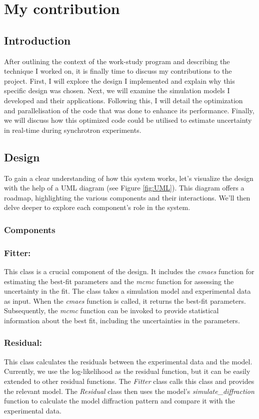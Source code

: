 \section{My contribution}

\subsection{Introduction}

After outlining the context of the work-study program and describing the technique I worked
on, it is finally time to discuss my contributions to the project. First, I will explore 
the design I implemented and explain why this specific design was chosen. Next, we will 
examine the simulation models I developed and their applications. Following this, I will 
detail the optimization and parallelisation of the code that was done to enhance its performance. 
Finally, we will discuss how this optimized code could be utilised to estimate uncertainty
in real-time during synchrotron experiments.

\subsection{Design}

To gain a clear understanding of how this system works, let's visualize the design with the help of a 
UML diagram (see Figure \ref{fig:UML}). This diagram offers a roadmap, highlighting the various components and their interactions.
 We'll then delve deeper to explore each component's role in the system.
\subsubsection{Components}

\subsubsection*{\textbf{Fitter:}}
This class is a crucial component of the design. It includes the \textit{cmaes} function for estimating the
best-fit parameters and the \textit{mcmc} function for assessing the uncertainty in the fit. The class takes
a simulation model and experimental data as input. When the \textit{cmaes} function is called, it returns the best-fit parameters.
Subsequently, the \textit{mcmc} function can be invoked to provide statistical information about the best
fit, including the uncertainties in the parameters.

\subsubsection*{\textbf{Residual:}}
This class calculates the residuals between the experimental data and the model.
Currently, we use the log-likelihood as the residual function, but it can be easily extended
to other residual functions. The \textit{Fitter} class calls this class and provides the relevant model.
The \textit{Residual} class then uses the model's \textit{simulate\_diffraction} function to calculate
the model diffraction pattern and compare it with the experimental data.

